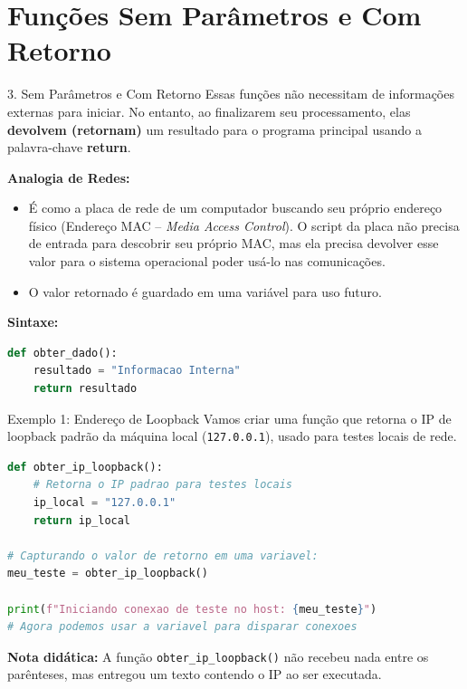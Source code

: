 \section{Funções Sem Parâmetros e Com Retorno}

\begin{frame}[fragile]{3. Sem Parâmetros e Com Retorno}
    Essas funções não necessitam de informações externas para iniciar. No entanto, ao finalizarem seu processamento, elas \textbf{devolvem (retornam)} um resultado para o programa principal usando a palavra-chave \textbf{return}.
    
    \vspace{0.3cm}
    \textbf{Analogia de Redes:}
    \begin{itemize}
        \item É como a placa de rede de um computador buscando seu próprio endereço físico (Endereço MAC -- \textit{Media Access Control}). O script da placa não precisa de entrada para descobrir seu próprio MAC, mas ela precisa devolver esse valor para o sistema operacional poder usá-lo nas comunicações.
        \item O valor retornado é guardado em uma variável para uso futuro.
    \end{itemize}
    
    \vspace{0.3cm}
    \textbf{Sintaxe:}
    \begin{lstlisting}[language=Python]
def obter_dado():
    resultado = "Informacao Interna"
    return resultado
    \end{lstlisting}
\end{frame}

\begin{frame}[fragile]{Exemplo 1: Endereço de Loopback}
    Vamos criar uma função que retorna o IP de loopback padrão da máquina local (\texttt{127.0.0.1}), usado para testes locais de rede.
    
    \begin{lstlisting}[language=Python]
def obter_ip_loopback():
    # Retorna o IP padrao para testes locais
    ip_local = "127.0.0.1"
    return ip_local

# Capturando o valor de retorno em uma variavel:
meu_teste = obter_ip_loopback()

print(f"Iniciando conexao de teste no host: {meu_teste}")
# Agora podemos usar a variavel para disparar conexoes
    \end{lstlisting}
    
    \vspace{0.2cm}
    \textbf{Nota didática:} A função \texttt{obter\_ip\_loopback()} não recebeu nada entre os parênteses, mas entregou um texto contendo o IP ao ser executada.
\end{frame}

